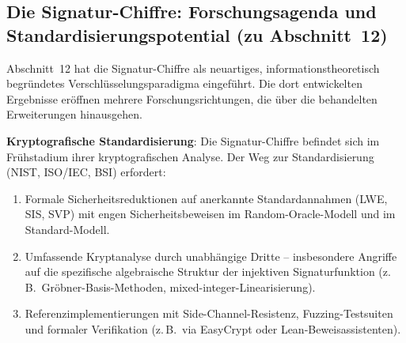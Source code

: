 ﻿\documentclass[a4paper,12pt]{article}
\theoremstyle{definition}
\begin{document}
\subsection{Die Signatur-Chiffre: Forschungsagenda und Standardisierungspotential (zu Abschnitt~12)}

Abschnitt~12 hat die Signatur-Chiffre als neuartiges,
informationstheoretisch begründetes Verschlüsselungsparadigma
eingeführt. Die dort entwickelten Ergebnisse eröffnen mehrere
Forschungsrichtungen, die über die behandelten Erweiterungen
hinausgehen.

\textbf{Kryptografische Standardisierung}:
Die Signatur-Chiffre befindet sich im Frühstadium ihrer
kryptografischen Analyse. Der Weg zur Standardisierung
(NIST, ISO/IEC, BSI) erfordert:
\begin{enumerate}
  \item Formale Sicherheitsreduktionen auf anerkannte
    Standardannahmen (LWE, SIS, SVP) mit engen Sicherheitsbeweisen
    im Random-Oracle-Modell und im Standard-Modell.
  \item Umfassende Kryptanalyse durch unabhängige Dritte --
    insbesondere Angriffe auf die spezifische algebraische Struktur
    der injektiven Signaturfunktion (z.\,B.\ Gröbner-Basis-Methoden,
    mixed-integer-Linearisierung).
  \item Referenzimplementierungen mit Side-Channel-Resistenz,
    Fuzzing-Testsuiten und formaler Verifikation (z.\,B.\
    via EasyCrypt oder Lean-Beweisassistenten).
\end{enumerate}
\end{document}
